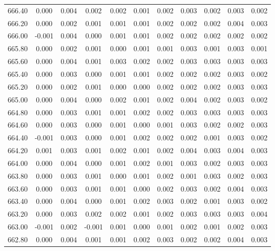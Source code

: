 \begin{longtable}{cccccccccc}
    666.40 &  0.000 &  0.004 &  0.002 &  0.002 &  0.001 &  0.002 &  0.003 &  0.002 &  0.003 &  0.002 \\
    666.20 &  0.000 &  0.002 &  0.001 &  0.001 &  0.001 &  0.002 &  0.002 &  0.002 &  0.004 &  0.003 \\
    666.00 & -0.001 &  0.004 &  0.000 &  0.001 &  0.001 &  0.002 &  0.002 &  0.002 &  0.002 &  0.002 \\
    665.80 &  0.000 &  0.002 &  0.001 &  0.000 &  0.001 &  0.001 &  0.003 &  0.001 &  0.003 &  0.001 \\
    665.60 &  0.000 &  0.004 &  0.001 &  0.003 &  0.002 &  0.002 &  0.003 &  0.003 &  0.003 &  0.003 \\
    665.40 &  0.000 &  0.003 &  0.000 &  0.001 &  0.001 &  0.002 &  0.002 &  0.002 &  0.003 &  0.002 \\
    665.20 &  0.000 &  0.002 &  0.001 &  0.000 &  0.000 &  0.002 &  0.002 &  0.002 &  0.003 &  0.003 \\
    665.00 &  0.000 &  0.004 &  0.000 &  0.002 &  0.001 &  0.002 &  0.004 &  0.002 &  0.003 &  0.002 \\
    664.80 &  0.000 &  0.003 &  0.001 &  0.001 &  0.002 &  0.002 &  0.003 &  0.003 &  0.003 &  0.003 \\
    664.60 &  0.000 &  0.003 &  0.000 &  0.001 &  0.000 &  0.001 &  0.003 &  0.002 &  0.002 &  0.003 \\
    664.40 & -0.001 &  0.003 &  0.000 &  0.001 &  0.002 &  0.002 &  0.002 &  0.001 &  0.003 &  0.002 \\
    664.20 &  0.001 &  0.003 &  0.001 &  0.002 &  0.001 &  0.002 &  0.004 &  0.003 &  0.004 &  0.003 \\
    664.00 &  0.000 &  0.004 &  0.000 &  0.001 &  0.002 &  0.001 &  0.003 &  0.002 &  0.003 &  0.003 \\
    663.80 &  0.000 &  0.003 &  0.001 &  0.000 &  0.001 &  0.002 &  0.001 &  0.003 &  0.002 &  0.003 \\
    663.60 &  0.000 &  0.003 &  0.001 &  0.001 &  0.000 &  0.002 &  0.003 &  0.002 &  0.004 &  0.003 \\
    663.40 &  0.000 &  0.004 &  0.000 &  0.001 &  0.002 &  0.003 &  0.002 &  0.001 &  0.003 &  0.002 \\
    663.20 &  0.000 &  0.003 &  0.002 &  0.002 &  0.001 &  0.002 &  0.003 &  0.003 &  0.003 &  0.004 \\
    663.00 & -0.001 &  0.002 & -0.001 &  0.001 &  0.000 &  0.001 &  0.002 &  0.001 &  0.002 &  0.003 \\
    662.80 &  0.000 &  0.004 &  0.001 &  0.001 &  0.002 &  0.003 &  0.002 &  0.002 &  0.004 &  0.003 \\

\end{longtable}
